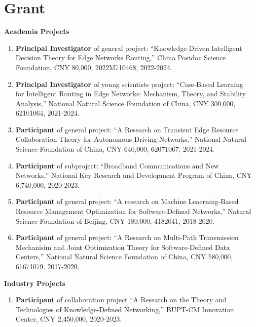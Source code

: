 \documentclass[letterpaper,11pt]{article}
\newcommand{\contentlength}{5.25in} %
\begin{document}
	\section{\textbf{Grant}}
	\begin{tcolorbox}[flush right,breakable,colback=white,colframe=white,width=\contentlength]
		\textbf{Academia Projects}
		\begin{enumerate}
			\item \textbf{Principal Investigator} of general project: “Knowledge-Driven Intelligent Decision Theory for Edge Networks Routing,” China Postdoc Science Foundation, CNY 80,000, 2022M710468, 2022-2024.
			\item \textbf{Principal Investigator} of young scientists project: “Case-Based Learning for Intelligent Routing in Edge Networks: Mechanism, Theory, and Stability Analysis,” National Natural Science Foundation of China, CNY 300,000, 62101064, 2021-2024.
			\item \textbf{Participant} of general project: “A Research on Transient Edge Resource Collaboration Theory for Autonomous Driving Networks,” National Natural Science Foundation of China, CNY 640,000, 62071067, 2021-2024.
			\item \textbf{Participant} of subproject: “Broadband Communications and New Networks,” National Key Research and Development Program of China, CNY 6,740,000, 2020-2023.
			\item \textbf{Participant} of general project: “A research on Machine Leaerning-Based Resource Management Optimization for Software-Defined Networks,” Natural Science Foundation of Beijing, CNY 180,000, 4182041, 2018-2020.
			\item \textbf{Participant} of general project: “A Research on Multi-Path Transmission Mechanisim and Joint Optimization Theory for Software-Defined Data Centers,” National Natural Science Foundation of China, CNY 580,000, 61671079, 2017-2020.
		\end{enumerate}
		\textbf{Industry Projects}
		\begin{enumerate}
			\item \textbf{Participant} of collaboration project “A Research on the Theory and Technologies of Knowledge-Defined Networking,” BUPT-CM Innovation Center, CNY 2,450,000, 2020-2023.
		\end{enumerate}
	\end{tcolorbox}
	
\end{document}
